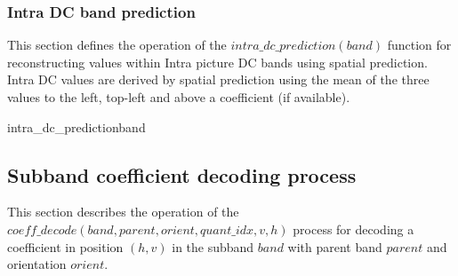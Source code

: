 \subsubsection{Intra DC band prediction}
\label{intradcprediction}

This section defines the operation of the $intra\_dc\_prediction(band)$ function
for reconstructing values within Intra picture DC bands using spatial prediction.
Intra DC values are derived by spatial prediction using the mean of the
three values to the left, top-left and above a coefficient (if available).

\begin{comment}
\begin{pseudo}{intra\_dc\_prediction}{band}
\bsFOR{v=0}{subband\_height(level)-1}
  \bsFOR{h=0}{subband\_width(level)-1}
    \bsCODE{prediction = 0 }
    \bsCODE{N = 0 }
    \bsIF{v>0}
      \bsCODE{prediction += band[v-1][h]}
      \bsCODE{N+=1}
      \bsIF{h>0}
        \bsCODE{prediction += band[v-1][h-1]+band[v][h-1]}
        \bsCODE{N+=1}
      \bsEND
    \bsELSE
      \bsIF{h>0}
        \bsCODE{prediction += band[0][h-1]}
        \bsCODE{N+=1}
      \bsEND
    \bsEND
    \bsCODE{prediction = prediction//N}
    \bsCODE{band[v][h] += prediction}
  \bsEND
\bsEND
\end{pseudo}
\end{comment}

\begin{pseudo}{intra\_dc\_prediction}{band}
        \bsELSE
        \bsEND
    \bsELSE
        \bsELSE
        \bsEND
    \bsEND
  \bsEND
\bsEND
\end{pseudo}
\subsection{Subband coefficient decoding process}

\label{wltcoeff}

This section describes the operation of the 
$coeff\_decode(band,parent,orient,quant\_idx,v,h)$ process
for decoding a coefficient in position $(h,v)$ in the subband $band$ with
parent band $parent$ and orientation $orient$.

